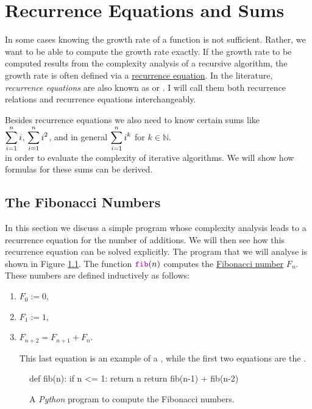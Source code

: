 \chapter{Recurrence Equations and Sums}
In some cases knowing the growth rate of a function is not sufficient.  Rather, we want to be able to compute
the growth rate exactly.  If the growth rate to be computed results from the complexity analysis of a recursive
algorithm, the growth rate is often defined via a
\href{https://en.wikipedia.org/wiki/Recurrence_relation}{recurrence equation}.  In the literature,
\emph{recurrence equations} are also known as  or
.  I will call them both recurrence relations and
recurrence equations interchangeably.

Besides recurrence equations we also need to know certain sums like 
\\[0.2cm]
\hspace*{1.3cm}
$\displaystyle\sum\limits_{i=1}^n i$,  \quad $\displaystyle\sum\limits_{i=1}^n i^2$, \quad and in general \quad
$\displaystyle \sum\limits_{i=1}^n i^k$ \quad for $k \in \mathbb{N}$.
\\[0.2cm]
in order to evaluate the complexity of iterative algorithms.  We will show how formulas for these sums can be
derived. 

\section{The Fibonacci Numbers}
In this section we discuss a simple program whose complexity analysis
leads to a recurrence equation for the  
number of additions.  We will then see how this recurrence equation can be solved explicitly.  The program that
we will analyse is shown in Figure \ref{fig:Fibonacci.ipynb}.  The function $\mytt{fib}(n)$ computes the
\href{https://en.wikipedia.org/wiki/Fibonacci_number}{Fibonacci number}  $F_n$.  These
numbers are defined inductively as follows:
\begin{enumerate}
\item $F_0 := 0$,
\item $F_1 := 1$, 
\item $F_{n+2} = F_{n+1} + F_n$.

  This last equation is an example of a , while the first two equations are the
  . 
\end{enumerate}

\begin{figure}[!h]
  \centering
\begin{python3code} 
    def fib(n):
        if n <= 1:
            return n
        return fib(n-1) + fib(n-2)
\end{python3code}
\vspace*{-0.7cm}
  \caption{A \textsl{Python} program to compute the Fibonacci numbers.}
  \label{fig:Fibonacci.ipynb}
\end{figure} 

